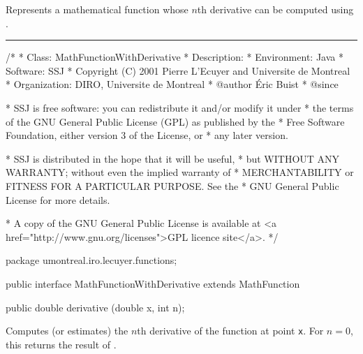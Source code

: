 
Represents a mathematical function whose
$n$th derivative can be computed using
.

\bigskip\hrule

\begin{code}
\begin{hide}
/*
 * Class:        MathFunctionWithDerivative
 * Description:
 * Environment:  Java
 * Software:     SSJ
 * Copyright (C) 2001  Pierre L'Ecuyer and Universite de Montreal
 * Organization: DIRO, Universite de Montreal
 * @author       Éric Buist
 * @since

 * SSJ is free software: you can redistribute it and/or modify it under
 * the terms of the GNU General Public License (GPL) as published by the
 * Free Software Foundation, either version 3 of the License, or
 * any later version.

 * SSJ is distributed in the hope that it will be useful,
 * but WITHOUT ANY WARRANTY; without even the implied warranty of
 * MERCHANTABILITY or FITNESS FOR A PARTICULAR PURPOSE.  See the
 * GNU General Public License for more details.

 * A copy of the GNU General Public License is available at
   <a href="http://www.gnu.org/licenses">GPL licence site</a>.
 */
\end{hide}
package umontreal.iro.lecuyer.functions;\begin{hide}

\end{hide}

public interface MathFunctionWithDerivative extends MathFunction\begin{hide} {
\end{hide}

   public double derivative (double x, int n);\begin{hide}
}\end{hide}
\end{code}
\begin{tabb}
   Computes (or estimates) the $n$th derivative
   of the function at point \texttt{x}.
   For $n=0$, this returns the result of
   .
\end{tabb}
\begin{htmlonly}
\end{htmlonly}

